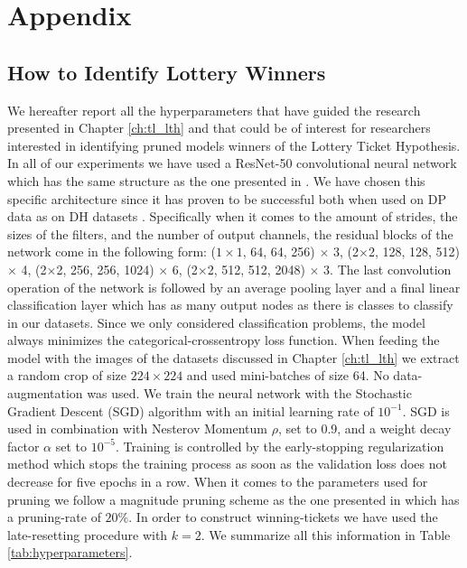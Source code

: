 
\chapter*{Appendix}
\label{ch:appendix}


\section{How to Identify Lottery Winners}

We hereafter report all the hyperparameters that have guided the research presented in Chapter \ref{ch:tl_lth} and that could be of interest for researchers interested in identifying pruned models winners of the Lottery Ticket Hypothesis.
In all of our experiments we have used a ResNet-50 convolutional neural network which has the same structure as the one presented in \cite{han2015deep}.
We have chosen this specific architecture since it has proven to be successful both when used on DP data \cite{mormont2018comparison} as on DH datasets \cite{sabatelli2018deep}. Specifically when it comes to the amount of strides, the sizes of the filters, and the number of output channels, the residual blocks of the network come in the following form:  ($1\times1$, 64, 64, 256) $\times$ 3, (2$\times$2, 128, 128, 512) $\times$ 4, (2$\times$2, 256, 256, 1024) $\times$ 6, (2$\times$2, 512, 512, 2048) $\times$ 3. The last convolution operation of the network is followed by an average pooling layer and a final linear classification layer which has as many output nodes as there is classes to classify in our datasets. Since we only considered classification problems, the model always minimizes the categorical-crossentropy loss function. When feeding the model with the images of the datasets discussed in Chapter \ref{ch:tl_lth} we extract a random crop of size $224\times224$ and used mini-batches of size 64. No data-augmentation was used. We train the neural network with the Stochastic Gradient Descent (SGD) algorithm with an initial learning rate of $10^{-1}$. SGD is used in combination with Nesterov Momentum $\rho$, set to 0.9, and a weight decay factor $\alpha$ set to $10^{-5}$. Training is controlled by the early-stopping regularization method which stops the training process as soon as the validation loss does not decrease for five epochs in a row. When it comes to the parameters used for pruning we follow a magnitude pruning scheme as the one presented in \cite{han2015learning} which has a pruning-rate of $20\%$. In order to construct winning-tickets we have used the late-resetting procedure with $k=2$. We summarize all this information in Table \ref{tab:hyperparameters}. 

